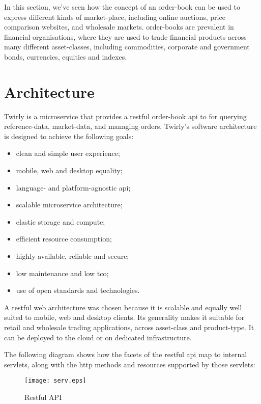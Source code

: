 \documentclass[11pt,a4paper]{article}
\newcommand{\twirly}{Twirly\cite{twirly}}
\begin{document}
In this section, we've seen how the concept of an \gls{order-book} can be used to express different
kinds of \gls{market-place}, including online \glspl{auction}, price comparison websites, and
wholesale \glspl{market}. \Glspl{order-book} are prevalent in financial organisations, where they
are used to trade financial products across many different \gls{asset}-classes, including
commodities, corporate and government bonds, currencies, equities and indexes.

\section{Architecture}

\twirly{} is a \gls{microservice} that provides a \gls{restful} \gls{order-book} \gls{api} to for
querying reference-data, market-data, and managing \glspl{order}. Twirly's\cite{twirly} software
architecture is designed to achieve the following goals:

\begin{itemize}
\item clean and simple user experience;
\item mobile, \gls{web} and desktop equality;
\item language- and platform-agnostic \gls{api};
\item scalable \gls{microservice} architecture;
\item elastic storage and compute;
\item efficient resource consumption;
\item highly available, reliable and secure;
\item low maintenance and low \gls{tco};
\item use of open standards and technologies.
\end{itemize}

A \Gls{restful} \gls{web} architecture was chosen because it is scalable and equally well suited to
mobile, \gls{web} and desktop clients. Its generality makes it suitable for retail and wholesale
trading applications, across \gls{asset}-class and product-type. It can be deployed to the
\gls{cloud} or on dedicated infrastructure.

The following diagram shows how the facets of the \gls{restful} \gls{api} map to internal
\glspl{servlet}, along with the \gls{http} methods and resources supported by those \glspl{servlet}:

\begin{figure}[H]
\centering
\texttt{[image: serv.eps]}
\caption{Restful API}
\end{figure}
\end{document}
